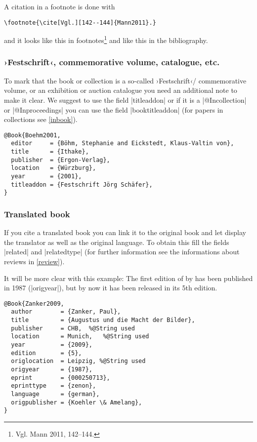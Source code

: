 \documentclass[a4paper,
10pt,
greek,
french,
spanish,
italian,
ngerman,
english
]{ltxdoc}
\begin{document}
A citation in a footnote is done with
\begin{lstlisting}
\footnote{\cite[Vgl.][142--144]{Mann2011}.}
\end{lstlisting} 

and it looks like this in footnotes\footnote{Vgl. Mann 2011, 142--144.}
and like this in the bibliography.

\subsubsection{›Festschrift‹, commemorative volume, catalogue, etc.}
To mark that the book or collection is a so-called ›Festschrift‹/ commemorative volume, 
or an exhibition or auction catalogue you need an additional note to make it clear.
We suggest to use the field |titleaddon| or if it is a |@Incollection| or |@Inproceedings| you can use the field |booktitleaddon| (for papers in collections see \cref{inbook}).
\begin{lstlisting}[style=bibentry,label=Boehm2001,caption={{@}Book\{Boehm2001,…\} }]
@Book{Boehm2001,
  editor     = {Böhm, Stephanie and Eickstedt, Klaus-Valtin von},
  title      = {Ithake},
  publisher  = {Ergon-Verlag},
  location   = {Würzburg},
  year       = {2001},
  titleaddon = {Festschrift Jörg Schäfer},
}
\end{lstlisting}

 
\subsubsection{Translated book}
If you cite a translated book you can link it to the original book and let display the translator as well as the original language. 
To obtain this fill the fields |related| and |relatedtype| (for further information see the informations about reviews in \cref{review}).

It will be more clear with this example:
The first edition of  by \citeauthor*{Zanker2009} has been published in 1987 (|origyear|), but by now it has been released in its 5th edition.

\begin{lstlisting}[style=bibentry,label=Zanker2009,caption={{@}Book\{Zanker2009,…\} }]
@Book{Zanker2009,
  author        = {Zanker, Paul},
  title         = {Augustus und die Macht der Bilder},
  publisher     = CHB, 	%@String used
  location      = Munich,	%@String used
  year          = {2009},
  edition       = {5},
  origlocation  = Leipzig, %@String used
  origyear      = {1987},
  eprint        = {000250713},
  eprinttype    = {zenon},
  language      = {german},
  origpublisher = {Koehler \& Amelang},
}
\end{lstlisting}
\end{document}
